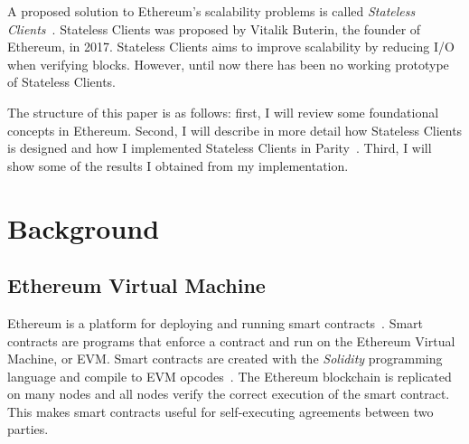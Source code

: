 \documentclass[12pt]{article}
\newcommand{\System}{Stateless Clients\xspace}
\begin{document}
A proposed solution to Ethereum's scalability problems is called \emph{\System}~\cite{statelessclients}. \System was proposed by Vitalik Buterin, the founder of Ethereum, in 2017. \System aims to improve scalability by reducing I/O when verifying blocks. However, until now there has been no working prototype of \System.

The structure of this paper is as follows: first, I will review some foundational concepts in Ethereum. Second, I will describe in more detail how \System is designed and how I implemented \System in Parity~\cite{parity}. Third, I will show some of the results I obtained from my implementation.

\section{Background}

\subsection{Ethereum Virtual Machine}

Ethereum is a platform for deploying and running smart contracts~\cite{yellowpaper}. Smart contracts are programs that enforce a contract and run on the Ethereum Virtual Machine, or EVM. Smart contracts are created with the \emph{Solidity} programming language and compile to EVM opcodes~\cite{solidity}. The Ethereum blockchain is replicated on many nodes and all nodes verify the correct execution of the smart contract. This makes smart contracts useful for self-executing agreements between two parties.
\end{document}
